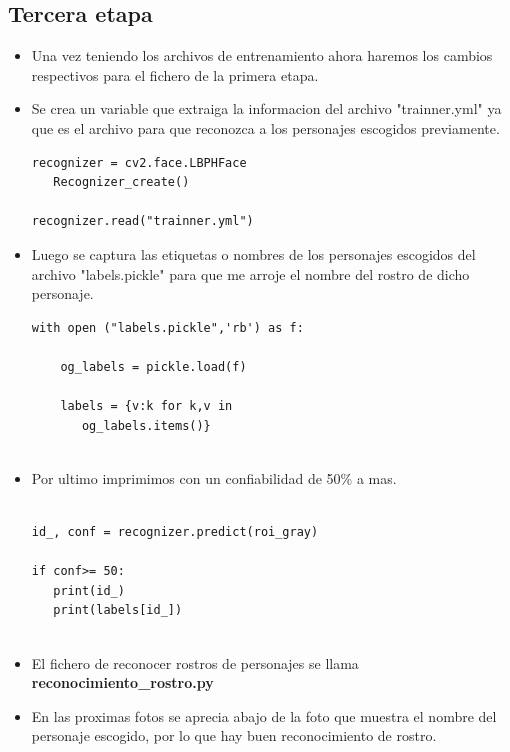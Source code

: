 \documentclass{vgtc}                          %
\begin{document}
\subsection{Tercera etapa}

\begin{itemize}

\item Una vez teniendo los archivos de entrenamiento ahora haremos los cambios respectivos para el fichero de la primera etapa.

\item Se crea un variable que extraiga la informacion del archivo "trainner.yml" ya que es el archivo para que reconozca a los personajes escogidos previamente.

\begin{lstlisting}
recognizer = cv2.face.LBPHFace
   Recognizer_create()

recognizer.read("trainner.yml")            
\end{lstlisting}

\item Luego se captura las etiquetas o nombres de los personajes escogidos del archivo "labels.pickle" para que me arroje el nombre del rostro de dicho personaje.

\begin{lstlisting}
with open ("labels.pickle",'rb') as f:
    
    og_labels = pickle.load(f)
    
    labels = {v:k for k,v in 
       og_labels.items()}   
              
\end{lstlisting}

\item Por ultimo imprimimos con un confiabilidad de 50\% a mas.
\begin{lstlisting}

id_, conf = recognizer.predict(roi_gray)

if conf>= 50:
   print(id_)
   print(labels[id_])
   
\end{lstlisting}

\item El fichero de reconocer rostros de personajes se llama \textbf{reconocimiento\_rostro.py}


\item En las proximas fotos se aprecia abajo de la foto que muestra el nombre del personaje escogido, por lo que hay buen reconocimiento de rostro.


\end{itemize}
\end{document}
